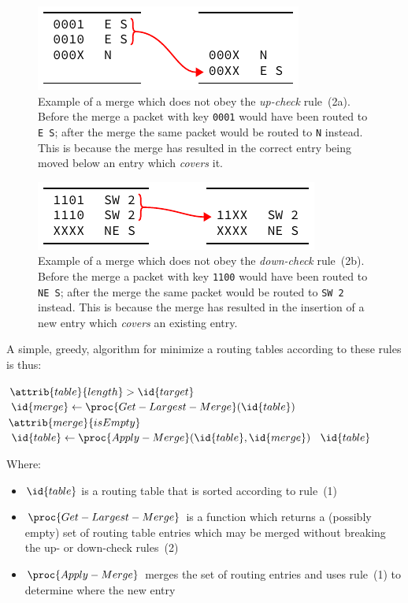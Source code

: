 \documentclass[conference]{IEEEtran}
\newcommand{\mytt}[1]{\texttt{\footnotesize#1}}
\begin{document}
  \begin{figure}
    \centering
    \includegraphics{figures/rule2a_example}
    \caption{
      Example of a merge which does not obey the \textit{up-check} rule~(2a).
      Before the merge a packet with key \mytt{0001} would have been routed to \mytt{E~S}; after the merge the same packet would be routed to \mytt{N} instead.
      This is because the merge has resulted in the correct entry being moved below an entry which \textit{covers} it.
    }
    \label{fig:algorithm/rule2a_example}
  \end{figure}

  \begin{figure}
    \centering
    \includegraphics{figures/rule2b_example}
    \caption{
      Example of a merge which does not obey the \textit{down-check} rule~(2b).
      Before the merge a packet with key \mytt{1100} would have been routed to \mytt{NE~S}; after the merge the same packet would be routed to \mytt{SW 2} instead.
      This is because the merge has resulted in the insertion of a new entry which \textit{covers} an existing entry.
    }
    \label{fig:algorithm/rule2b_example}
  \end{figure}

  A simple, greedy, algorithm for minimize a routing tables according to these rules is thus:

  \begin{codebox}
    \li \While $\attrib{table}{length} >  \id{target}$
    \li \Do $\id{merge} \gets \proc{Get-Largest-Merge}(\id{table})$
    \li     \If $\attrib{merge}{isEmpty}$
    \li     \Then {} \End
    \li     $\id{table} \gets \proc{Apply-Merge}(\id{table}, \id{merge})$
        \End
    \li \Return $\id{table}$
  \end{codebox}

  \noindent Where:
  \begin{itemize}
    \item $\id{table}$ is a routing table that is sorted according to rule~(1)
    \item $\proc{Get-Largest-Merge}$ is a function which returns a (possibly empty) set of routing table entries which may be merged without breaking the up- or down-check rules~(2)
    \item $\proc{Apply-Merge}$ merges the set of routing entries and uses rule~(1) to determine where the new entry
  \end{itemize}
\end{document}
